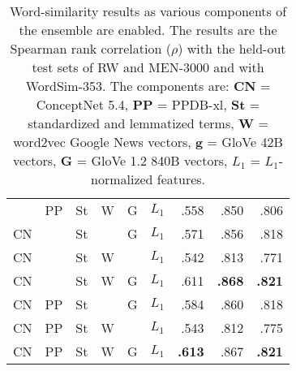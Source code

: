 \documentclass[11pt,letterpaper]{article}
\begin{document}
\begin{table}[ht]
\begin{tabular}{llllllrrr}
     & PP   & St   & W    & G    & $L_1$  &    .558 &    .850 &    .806 \\  %
CN   &      & St   &      & G    & $L_1$  &    .571 &    .856 &    .818 \\  %
CN   &      & St   & W    &      & $L_1$  &    .542 &    .813 &    .771 \\  %
CN   &      & St   & W    & G    & $L_1$  &    .611 &\bf .868 &\bf .821 \\  %
CN   & PP   & St   &      & G    & $L_1$  &    .584 &    .860 &    .818 \\  %
CN   & PP   & St   & W    &      & $L_1$  &    .543 &    .812 &    .775 \\  %
CN   & PP   & St   & W    & G    & $L_1$  &\bf .613 &    .867 &\bf .821 \\  %
\bottomrule
\end{tabular}

\caption{
    Word-similarity results as various components of the ensemble are enabled.
    The results are the Spearman rank correlation ($\rho$) with the held-out
    test sets of RW and MEN-3000 and with WordSim-353.
    The components are: {\bf CN} = ConceptNet 5.4,
    {\bf PP} = PPDB-xl, {\bf St} = standardized and lemmatized terms,
    {\bf W} = word2vec Google News vectors, {\bf g} = GloVe 42B vectors,
    {\bf G} = GloVe 1.2 840B vectors, {\bf $L_1$} = $L_1$-normalized features.
}
\label{eval-bigtable}
\end{table}
\end{document}
